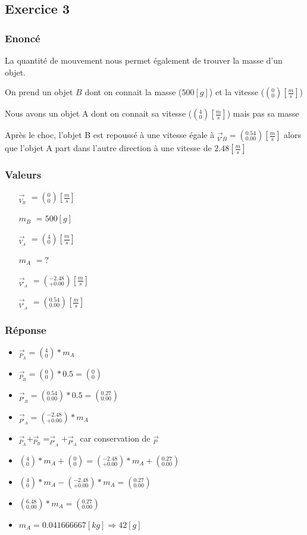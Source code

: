 \subsection{Exercice 3}
\subsubsection{Enoncé}
La quantité de mouvement nous permet également de trouver la masse d'un objet.

On prend un objet $B$ dont on connait la masse ($500[g]$) et la vitesse ($(_{0}^{0})[\frac{m}{s}]$)

Nous avons un objet A dont on connait sa vitesse ($(_{0}^{4})[\frac{m}{s}]$) mais pas sa masse



Après le choc, l'objet B est repoussé à une vitesse égale à $_{V'B}^{\rightarrow} = (_{0.00}^{0.54})[\frac{m}{s}]$ alors que l'objet A part dans l'autre direction à une vitesse de $2.48[\frac{m}{s}]$

\subsubsection{Valeurs}
\begin{itemize}
   \item[$_{V_B}^{\rightarrow}$] $ = (_{0}^{0})[\frac{m}{s}]$
   \item[$m_B$] $ = 500[g]$
   \item[$_{V_A}^{\rightarrow}$] $ = (_{0}^{4})[\frac{m}{s}]$
   \item[$m_A$] $ = ?$
   \item[$_{V'_A}^{\rightarrow}$] $ = (_{+0.00}^{-2.48})[\frac{m}{s}]$
   \item[$_{V'_A}^{\rightarrow}$] $ = (_{0.00}^{0.54})[\frac{m}{s}]$
   
\end{itemize}

\subsubsection{Réponse}
\begin{itemize}
    \item $_{P_A}^{\rightarrow} = (_{0}^{4}) * m_A$
    \item  $_{P_B}^{\rightarrow} = (_{0}^{0}) * 0.5 = (_{0}^{0})$
    \item  $_{P'_B}^{\rightarrow} = (_{0.00}^{0.54}) * 0.5 = (_{0.00}^{0.27})$
    \item  $_{P'_A}^{\rightarrow} = (_{+0.00}^{-2.48}) * m_A$
    \item $_{P_A}^{\rightarrow} + _{P_B}^{\rightarrow} = _{P'_A}^{\rightarrow} + _{P'_A}^{\rightarrow}$ car conservation de $_{P}^{\rightarrow}$
    \item $(_{0}^{4}) * m_A + (_{0}^{0}) = (_{+0.00}^{-2.48}) * m_A + (_{0.00}^{0.27})$
    \item $(_{0}^{4}) * m_A - (_{+0.00}^{-2.48}) * m_A = (_{0.00}^{0.27})$
    \item $(_{0.00}^{6.48}) * m_A = (_{0.00}^{0.27})$
    \item $m_A = 0.041666667[kg] \Rightarrow 42[g]$
\end{itemize}
